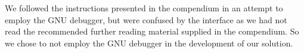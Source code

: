 We followed the instructions presented in the compendium in an attempt to employ the GNU debugger, but were confused by the interface as we had not read the recommended further reading material supplied in the compendium.
So we chose to not employ the GNU debugger in the development of our solution.